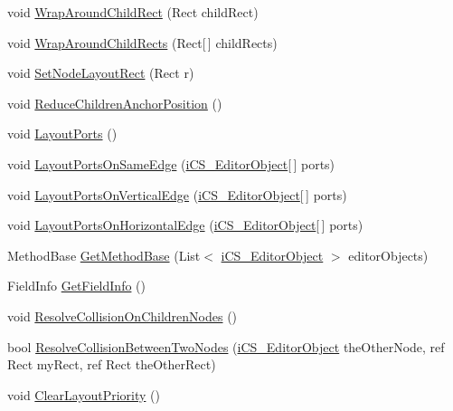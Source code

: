 \begin{DoxyCompactItemize}
\item 
void \hyperlink{classi_c_s___editor_object_a9b2a3b6b2e4c8177405ddf338e8ce120}{Wrap\+Around\+Child\+Rect} (Rect child\+Rect)
\item 
void \hyperlink{classi_c_s___editor_object_a30ef1f22646d21921fc98cd063b9eacf}{Wrap\+Around\+Child\+Rects} (Rect\mbox{[}$\,$\mbox{]} child\+Rects)
\item 
void \hyperlink{classi_c_s___editor_object_a427ab1c8294baf22a0a5a7ffc7eee265}{Set\+Node\+Layout\+Rect} (Rect r)
\item 
void \hyperlink{classi_c_s___editor_object_a43f27066749e54b2fbf70fac4ff4d543}{Reduce\+Children\+Anchor\+Position} ()
\item 
void \hyperlink{classi_c_s___editor_object_a1a06c475b5b219fd8160f3ba1cff4340}{Layout\+Ports} ()
\item 
void \hyperlink{classi_c_s___editor_object_a24fff7714f6ebf554434f26916483df1}{Layout\+Ports\+On\+Same\+Edge} (\hyperlink{classi_c_s___editor_object}{i\+C\+S\+\_\+\+Editor\+Object}\mbox{[}$\,$\mbox{]} ports)
\item 
void \hyperlink{classi_c_s___editor_object_a03dc64d940f2deb13dfc19470c1a1723}{Layout\+Ports\+On\+Vertical\+Edge} (\hyperlink{classi_c_s___editor_object}{i\+C\+S\+\_\+\+Editor\+Object}\mbox{[}$\,$\mbox{]} ports)
\item 
void \hyperlink{classi_c_s___editor_object_a39b29cb25eb03007a75c508e0144221e}{Layout\+Ports\+On\+Horizontal\+Edge} (\hyperlink{classi_c_s___editor_object}{i\+C\+S\+\_\+\+Editor\+Object}\mbox{[}$\,$\mbox{]} ports)
\item 
Method\+Base \hyperlink{classi_c_s___editor_object_ac8e2f95607c81282a4cfa3858b274785}{Get\+Method\+Base} (List$<$ \hyperlink{classi_c_s___editor_object}{i\+C\+S\+\_\+\+Editor\+Object} $>$ editor\+Objects)
\item 
Field\+Info \hyperlink{classi_c_s___editor_object_a8b38aeff3497438592fd5a2bc693112d}{Get\+Field\+Info} ()
\item 
void \hyperlink{classi_c_s___editor_object_a36a4d83dca3d86c4efef7ed3b833955d}{Resolve\+Collision\+On\+Children\+Nodes} ()
\item 
bool \hyperlink{classi_c_s___editor_object_a921fdabbc6e1527af63055a5b659e693}{Resolve\+Collision\+Between\+Two\+Nodes} (\hyperlink{classi_c_s___editor_object}{i\+C\+S\+\_\+\+Editor\+Object} the\+Other\+Node, ref Rect my\+Rect, ref Rect the\+Other\+Rect)
\item 
void \hyperlink{classi_c_s___editor_object_ac098cca1860a5a1bd2c25ca515ee43aa}{Clear\+Layout\+Priority} ()

\end{DoxyCompactItemize}

